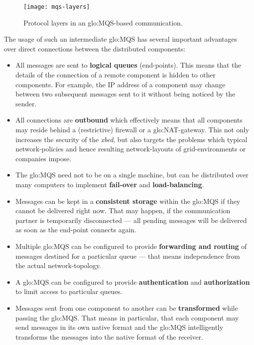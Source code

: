 \begin{figure}[ht]
  \centering
  \texttt{[image: mqs-layers]}
  \caption{Protocol layers in an \gls{glo:MQS}-based communication.}
  \label{fig:mqs-layers}
\end{figure}

The  usage of  such an  intermediate \gls{glo:MQS}  has  several important
advantages over direct connections between the distributed components:

\begin{itemize}
\item All  messages are sent to \textbf{logical  queues} (\ie end-points).
  This means that  the details of the connection of  a remote component is
  hidden to other components.  For  example, the IP address of a component
  may  change between  two subsequent  messages sent  to it  without being
  noticed by the sender.
\item All  connections are \textbf{outbound} which  effectively means that
  all  components  may  reside   behind  a  (restrictive)  firewall  or  a
  \gls{glo:NAT}-gateway.   This not  only  increases the  security of  the
  \emph{xbed},   but    also   targets   the    problems   which   typical
  network-policies     and    hence    resulting     network-layouts    of
  grid-environments or companies impose.
\item The  \gls{glo:MQS} need not  to be on  a single machine, but  can be
  distributed  over  many computers  to  implement \textbf{fail-over}  and
  \textbf{load-balancing}.
\item Messages  can be  kept in a  \textbf{consistent storage}  within the
  \gls{glo:MQS} if they  cannot be delivered right now.   That may happen,
  if the communication partner is temporarily disconnected --- all pending
  messages will be delivered as soon as the end-point connects again.
\item    Multiple   \gls{glo:MQS}   can    be   configured    to   provide
  \textbf{forwarding and  routing} of  messages destined for  a particular
  queue --- that means independence from the actual network-topology.
\item A \gls{glo:MQS} can be configured to provide \textbf{authentication}
  and \textbf{authorization} to limit access to particular queues.
\item   Messages   sent   from   one   component   to   another   can   be
  \textbf{transformed}  while passing  the \gls{glo:MQS}.   That  means in
  particular,  that each  component may  send messages  in its  own native
  format and the \gls{glo:MQS}  intelligently transforms the messages into
  the native format of the receiver.
\end{itemize}

